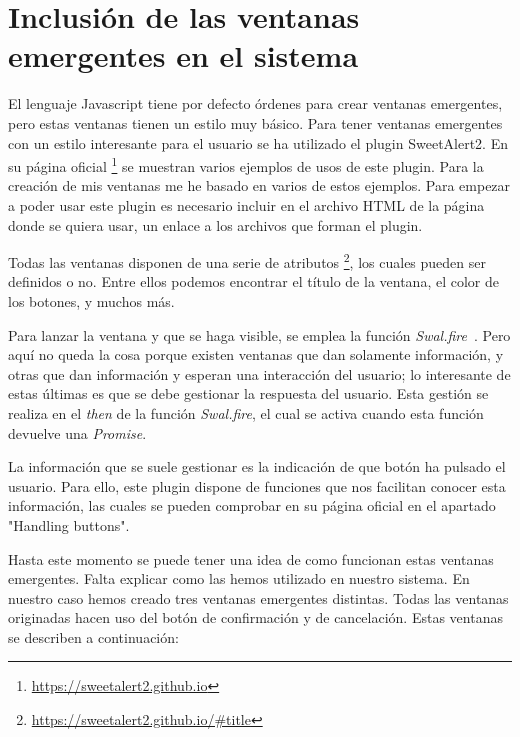 \section{Inclusión de las ventanas emergentes en el sistema} \label{sec:inclu_ventanas_emer}

El lenguaje Javascript tiene por defecto órdenes para crear ventanas emergentes, pero estas ventanas tienen un estilo muy básico. Para tener ventanas emergentes con un estilo interesante para el usuario se ha utilizado el plugin SweetAlert2. En su página oficial \footnote{\url{https://sweetalert2.github.io}} se muestran varios ejemplos de usos de este plugin. Para la creación de mis ventanas me he basado en varios de estos ejemplos. Para empezar a poder usar este plugin es necesario incluir en el archivo HTML de la página donde se quiera usar, un enlace a los archivos que forman el plugin.

Todas las ventanas disponen de una serie de atributos \footnote{\url{https://sweetalert2.github.io/#title}}, los cuales pueden ser definidos o no. Entre ellos podemos encontrar el título de la ventana, el color de los botones, y muchos más.

Para lanzar la ventana y que se haga visible, se emplea la función \textit{Swal.fire}\ . Pero aquí no queda la cosa porque existen ventanas que dan solamente información, y otras que dan información y esperan una interacción del usuario; lo interesante de estas últimas es que se debe gestionar la respuesta del usuario. Esta gestión se realiza en el \textit{then} de la función \textit{Swal.fire}, el cual se activa cuando esta función devuelve una \textit{Promise}.

La información que se suele gestionar es la indicación de que botón ha pulsado el usuario. Para ello, este plugin dispone de funciones que nos facilitan conocer esta información, las cuales se pueden comprobar en su página oficial en el apartado "Handling buttons".

Hasta este momento se puede tener una idea de como funcionan estas ventanas emergentes. Falta explicar como las hemos utilizado en nuestro sistema. En nuestro caso hemos creado tres ventanas emergentes distintas. Todas las ventanas originadas hacen uso del botón de confirmación y de cancelación. Estas ventanas se describen a continuación:

